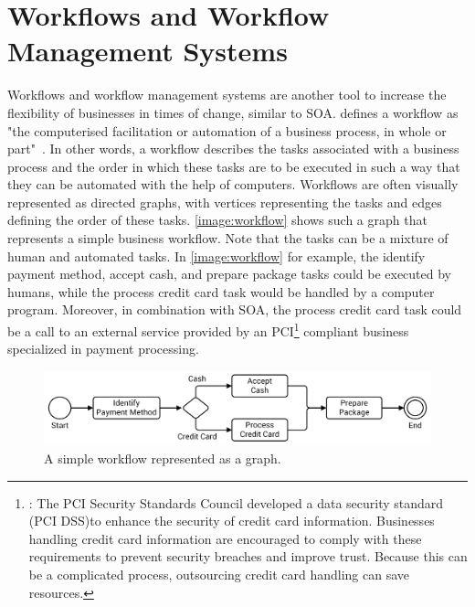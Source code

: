 \section{Workflows and Workflow Management Systems}

Workflows and workflow management systems are another tool to increase the flexibility of businesses in times of change, similar to SOA.
\citeauthor*{workflow:referencemodel} defines a workflow as "the computerised facilitation or automation of a business process, in whole or part"~\autocite{workflow:referencemodel}.
In other words, a workflow describes the tasks associated with a business process and the order in which these tasks are to be executed in such a way that they can be automated with the help of computers.
Workflows are often visually represented as directed graphs, with vertices representing the tasks and edges defining the order of these tasks.
\autoref{image:workflow} shows such a graph that represents a simple business workflow.
Note that the tasks can be a mixture of human and automated tasks.
In \autoref{image:workflow} for example, the identify payment method, accept cash, and prepare package tasks could be executed by humans, while the process credit card task would be handled by a computer program.
Moreover, in combination with SOA, the process credit card task could be a call to an external service provided by an PCI\footnote{: The PCI Security Standards Council developed a data security standard (PCI DSS)\footnotemark to enhance the security of credit card information. Businesses handling credit card information are encouraged to comply with these requirements to prevent security breaches and improve trust. Because this can be a complicated process, outsourcing credit card handling can save resources.} compliant business specialized in payment processing.


\begin{figure}[!htbp]
	\centering
	\includegraphics[resolution=600]{fundamentals/assets/workflow}
	\caption{A simple workflow represented as a graph.}
	\label{image:workflow}
\end{figure}

